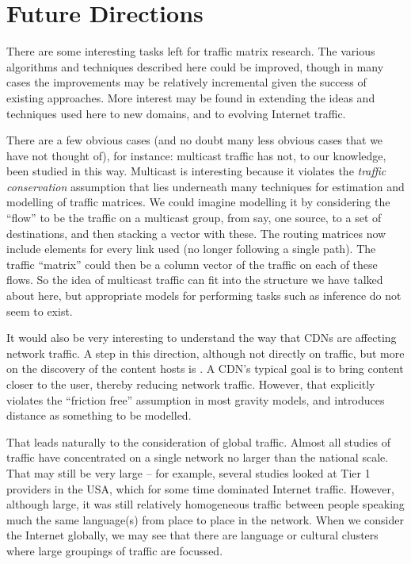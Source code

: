 \section{Future Directions}
\label{sec:future}

There are some interesting tasks left for traffic matrix
research. The various algorithms and techniques described
here could be improved, though in many cases the improvements may be
relatively incremental given the success of existing approaches. More
interest may be found in extending the ideas and techniques used here
to new domains, and to evolving Internet traffic.

There are a few obvious cases (and no doubt many less obvious cases
that we have not thought of), for instance: multicast traffic has not,
to our knowledge, been studied in this way. Multicast is interesting
because it violates the {\em traffic conservation} assumption that
lies underneath many techniques for estimation and modelling of
traffic matrices. We could imagine modelling it by considering the
``flow'' to be the traffic on a multicast group, from say, one source,
to a set of destinations, and then stacking a vector with these. The
routing matrices now include elements for every link used (no longer
following a single path). The traffic ``matrix'' could then be a
column vector of the traffic on each of these flows. So the idea of
multicast traffic can fit into the structure we have talked about
here, but appropriate models for performing tasks such as inference
do not seem to exist.

It would also be very interesting to understand the way that CDNs are
affecting network traffic. A step in this direction, although not directly
on traffic, but more on the discovery of the content hosts is \cite{Ager11CDN}.
A CDN's typical goal is to bring content
closer to the user, thereby reducing network traffic. However, that
explicitly violates the ``friction free'' assumption in most gravity
models, and introduces distance as something to be modelled.

That leads naturally to the consideration of global traffic. Almost all
studies of traffic have concentrated on a single network no larger
than the national scale. That may still be very large -- for example,
several studies looked at Tier 1 providers in the USA, which for some
time dominated Internet traffic. However, although large, it was still
relatively homogeneous traffic between people speaking much the same
language(s) from place to place in the network. When we consider the
Internet globally, we may see that there are language or cultural
clusters where large groupings of traffic are focussed.

